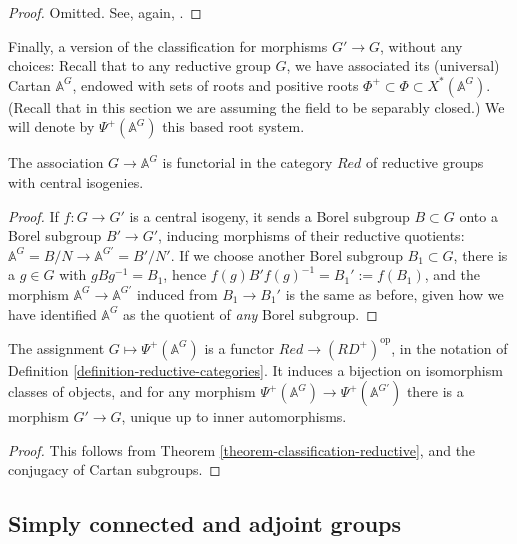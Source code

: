 \begin{proof}
 Omitted. See, again, \cite{Springer-Corvallis}. 
\end{proof}

Finally, a version of the classification for morphisms $G'\to G$, without any choices: Recall that to any reductive group $G$, we have associated its (universal) Cartan $\mathbb A^G$, endowed with sets of roots and positive roots $\Phi^+\subset \Phi\subset X^*(\mathbb A^G)$. (Recall that in this section we are assuming the field to be separably closed.) We will denote by $\Psi^+(\mathbb A^G)$ this based root system.

\begin{lemma}
 \label{lemma-Cartan-functorial}
The association $G\to \mathbb A^G$ is functorial in the category $Red$ of reductive groups with central isogenies.
\end{lemma}

\begin{proof}
 If $f:G\to G'$ is a central isogeny, it sends a Borel subgroup $B\subset G$ onto a Borel subgroup $B'\to G'$, inducing morphisms of their reductive quotients: $\mathbb A^G=B/N\to \mathbb A^{G'}=B'/N'$. If we choose another Borel subgroup $B_1\subset G$, there is a $g\in G$ with $g B g^{-1} = B_1$, hence $f(g) B' f(g)^{-1} = B_1':=f(B_1)$, and the morphism $\mathbb A^G\to \mathbb A^{G'}$ induced from $B_1\to B_1'$ is the same as before, given how we have identified $\mathbb A^G$ as the quotient of \emph{any} Borel subgroup.
\end{proof}


\begin{theorem}
\label{theorem-classification-with-universal-Cartan}
The assignment $G \mapsto \Psi^+(\mathbb A^G)$ is a functor $Red\to (RD^+)^{\text{op}}$, in the notation of Definition \ref{definition-reductive-categories}. It induces a bijection on isomorphism classes of objects, and for any morphism $\Psi^+(\mathbb A^{G}) \to \Psi^+(\mathbb A^{G'})$ there is a morphism $G'\to G$, unique up to inner automorphisms.
\end{theorem}

\begin{proof}
 This follows from Theorem \ref{theorem-classification-reductive}, and the conjugacy of Cartan subgroups.
\end{proof}





\subsection{Simply connected and adjoint groups}
\label{subsection-simply-connected-adjoint}

